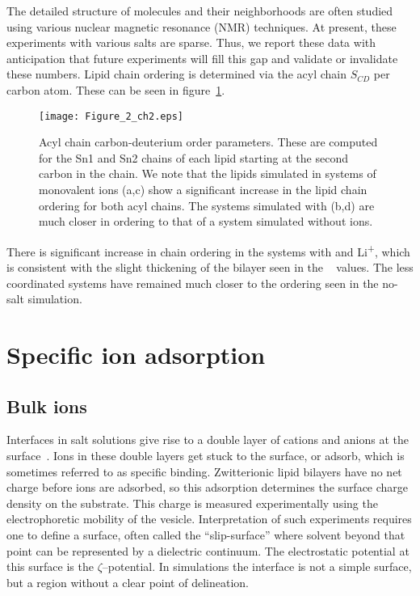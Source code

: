 The detailed structure of molecules and their neighborhoods are often studied using 
various nuclear magnetic resonance (NMR) techniques.
{At present, these experiments with various salts are sparse.}
{Thus,} we report these data with anticipation that future experiments will fill this gap and validate
or invalidate
these numbers.
Lipid chain ordering is determined via the acyl chain $S_{CD}$ per carbon
atom. These can be seen in figure~\ref{fig:op:ch2}. 
\begin{figure}
    \caption[Acyl-chain order parameters]{Acyl chain carbon-deuterium order parameters. These are computed for the Sn1 and Sn2 chains of each lipid starting at the 
        second carbon in the chain\cite{egberts:1988,Douliez:1995}. We note that the lipids simulated in systems of monovalent ions (a,c) show a significant increase
in the lipid chain ordering for both acyl chains. The systems simulated with \mg (b,d) are much closer in ordering to that of a system
simulated without ions.}
    \label{fig:op:ch2}
    \texttt{[image: Figure\_2\_ch2.eps]}
\end{figure}

There is significant increase in chain ordering in the systems 
with \na and Li\textsuperscript{+}, which {is} consistent with the slight thickening
of the bilayer seen in the \db~ values. The less coordinated \mg systems have remained much closer to the 
ordering seen in the no-salt simulation.


\section{Specific ion adsorption}
\subsection{Bulk ions}

Interfaces in salt solutions give rise to a double layer of cations and anions at the surface~\cite{israelachvili:2011:intermol}. 
Ions in these double layers get stuck to the surface, or adsorb, which is sometimes referred to as specific binding. Zwitterionic lipid bilayers have no net charge before ions are adsorbed,
so this adsorption
determines the surface charge density on the substrate. This charge is measured experimentally using the electrophoretic mobility of the vesicle. Interpretation
of such experiments requires one to define a surface, often called the ``slip-surface'' where solvent 
beyond that point
can be represented by a dielectric continuum. The electrostatic potential at this surface is the $\zeta$--potential.
In simulations the interface is not a simple surface, but a region {without a clear point of delineation}. 

